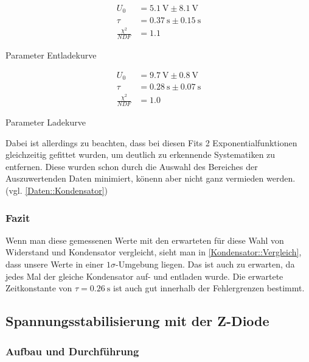 \documentclass[12pt,twoside,a4paper]{scrartcl}
\begin{document}
				\begin{table}[H]
					\centering
					\label{Kondensator::Vergleich}
					\begin{minipage}{0.4 \textwidth}
						\begin{align*}
							U_0 &= \SI{5.1}{\volt} \pm \SI{8.1}{\volt} \\
							\tau &= \SI{0.37}{\second} \pm \SI{0.15}{\second} \\
							\frac{\chi^2}{NDF} &= 1.1
						\end{align*}
						\caption{Parameter Entladekurve}
					\end{minipage}
					\begin{minipage}{0.4 \textwidth}
						 \begin{align*}
							 	U_0 &= \SI{9.7}{\volt} \pm \SI{0.8}{\volt}\\
							 	\tau &= \SI{0.28}{\second} \pm \SI{0.07}{\second}\\
								\frac{\chi^2}{NDF} &= 1.0
						 \end{align*}
						\caption{Parameter Ladekurve}
					\end{minipage}
				\end{table}

			Dabei ist allerdings zu beachten, dass bei diesen Fits 2 Exponentialfunktionen gleichzeitig gefittet wurden, um deutlich zu erkennende Systematiken zu entfernen. Diese wurden schon durch die Auswahl des Bereiches der Auszuwertenden Daten minimiert, könenn aber nicht ganz vermieden werden. (vgl. \ref{Daten::Kondensator})

			\subsubsection{Fazit}
				Wenn man diese gemessenen Werte mit den erwarteten für diese Wahl von Widerstand und Kondensator vergleicht, sieht man in \ref{Kondensator::Vergleich}, dass unsere Werte in einer $1 \sigma$-Umgebung liegen. Das ist auch zu erwarten, da jedes Mal der gleiche Kondensator auf- und entladen wurde.
				Die erwartete Zeitkonstante von $\tau = \SI{0.26}{\second}$ ist auch gut innerhalb der Fehlergrenzen bestimmt.

	\subsection{Spannungsstabilisierung mit der Z-Diode}

		\subsubsection{Aufbau und Durchführung}
\end{document}
